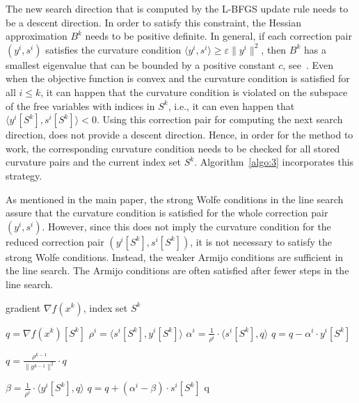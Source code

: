 \documentclass[letterpaper]{article} %
\newcommand{\vareps}{\varepsilon}
\newcommand{\sprod}[2]{\langle{#1}, {#2}\rangle}
\begin{document}
The new search direction that is computed by the L-BFGS update rule needs to be a descent direction. In order to satisfy this constraint, the Hessian approximation $B^k$ needs to be positive definite. In general, if each correction pair $(y^i, s^i)$ satisfies the curvature condition $\sprod{y^i}{s^i}\geq \vareps \|y^i\|^2$, then $B^k$ has a smallest eigenvalue that can be bounded by a positive constant $c$, see~\cite{MokhtariR15}. Even when the objective function is convex and the curvature condition is satisfied for all $i\leq k$, it can happen that the curvature condition is violated on the subspace of the free variables with indices in $S^k$, i.e., it can even happen that $\sprod{y^i[S^k]}{s^i[S^k]}< 0$. Using this correction pair for computing the next search direction, does not provide a descent direction. Hence, in order for the method to work, the corresponding curvature condition needs to be checked for all stored curvature pairs and the current index set $S^k$. Algorithm~\ref{algo:3} incorporates this strategy. 

As mentioned in the main paper, the strong Wolfe conditions in the line search assure that the curvature condition is satisfied for the whole correction pair $(y^i, s^i)$. However, since this does not imply the curvature condition for the reduced correction pair $(y^i[S^k], s^i[S^k])$, it is not necessary to satisfy the strong Wolfe conditions. Instead, the weaker Armijo conditions are sufficient in the line search. The Armijo conditions are often satisfied after fewer steps in the line search.

\setcounter{algorithm}{2}
\begin{algorithm}[h!]
   \caption{Modified Two-loop Recursion}
   \label{algo:3}
\begin{algorithmic}[1]
    gradient $\nabla f(x^k)$, index set $S^k$
   \vspace{0.2cm}

  \STATE $q=\nabla f(x^k)[S^k]$   
   \STATE $\rho^i=\sprod{s^i[S^k]}{y^i[S^k]}$
   \IF{$\rho^i > \vareps \|y^i\|^2$}
   \STATE $\alpha^i = \frac{1}{\rho^i} \cdot \sprod{s^i[S^k]}{q}$
   \STATE $q = q- \alpha^i \cdot y^i[S^k]$
   \ENDIF
   \ENDFOR

   \IF{$\rho^{k-1} > \vareps \|y^{k-1}\|^2$}
   \STATE $q = \frac{\rho^{k-1}}{\|y^{k-1}\|^2} \cdot q$
   \ENDIF
  
   \IF{$\rho^i > \vareps \|y^i\|^2$}
   \STATE $\beta = \frac{1}{\rho^i} \cdot \sprod{y^i[S^k]}{q}$
   \STATE $q = q + (\alpha^i-\beta) \cdot s^i[S^k]$
   \ENDIF
   \ENDFOR
   \RETURN q
\end{algorithmic}
\end{algorithm}
\end{document}
